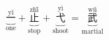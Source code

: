 \[ \underbrace{\overset{\text{yī}}{\text{一}}}_{\text{one}} + \underbrace{\overset{\text{zhǐ}}{\text{止}}}_{\text{stop}} + \underbrace{\overset{\text{yì}}{\text{弋}}}_{\text{shoot}} = \underbrace{\overset{\text{wǔ}}{\text{武}}}_{\text{martial}} \]
